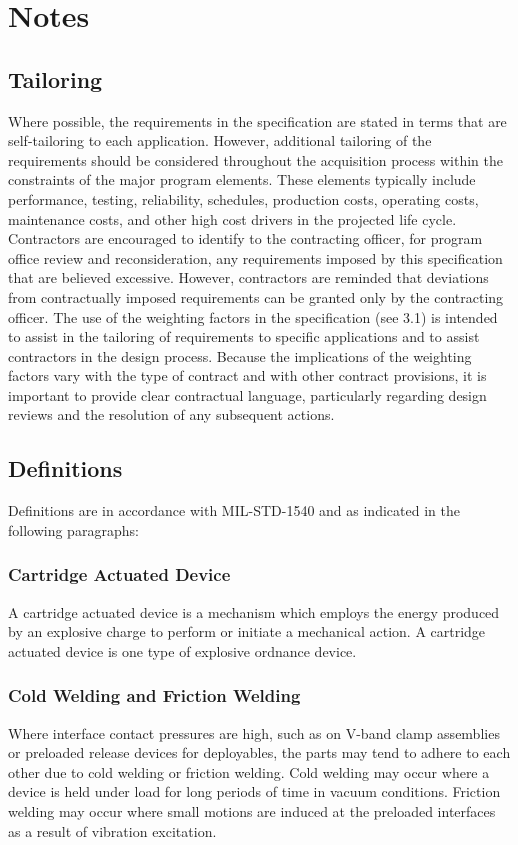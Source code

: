 \documentclass[12pt]{article}
\begin{document}
\section{Notes}

\subsection{Tailoring}
Where possible, the requirements in the specification are stated in terms that are self-tailoring to each application. 
However, additional tailoring of the requirements should be considered throughout the acquisition process within the constraints of the major program elements. 
These elements typically include performance, testing, reliability, schedules, production costs, operating costs, maintenance costs, and other high cost drivers in the projected life cycle. 
Contractors are encouraged to identify to the contracting officer, for program office review and reconsideration, any requirements imposed by this specification that are believed excessive. 
However, contractors are reminded that deviations from contractually imposed requirements can be granted only by the contracting officer. 
The use of the weighting factors in the specification (see 3.1) is intended to assist in the tailoring of requirements to specific applications and to assist contractors in the design process. 
Because the implications of the weighting factors vary with the type of contract and with other contract provisions, it is important to provide clear contractual language, particularly regarding design reviews and the resolution of any subsequent actions.

\clearpage
\subsection{Definitions}
Definitions are in accordance with MIL-STD-1540 and as indicated in the following paragraphs:

\subsubsection{Cartridge Actuated Device}
A cartridge actuated device is a mechanism which employs the energy produced by an explosive charge to perform or initiate a mechanical action. 
A cartridge actuated device is one type of explosive ordnance device.

\subsubsection{Cold Welding and Friction Welding}
Where interface contact pressures are high, such as on V-band clamp assemblies or preloaded release devices for deployables, the parts may tend to adhere to each other due to cold welding or friction welding. 
Cold welding may occur where a device is held under load for long periods of time in vacuum conditions. 
Friction welding may occur where small motions are induced at the preloaded interfaces as a result of vibration excitation.
\end{document}
